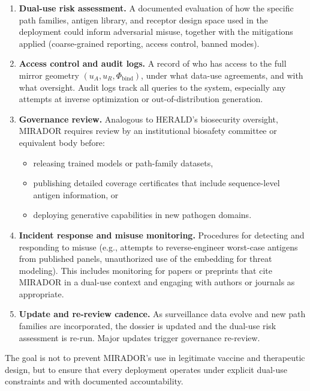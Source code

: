 \documentclass[11pt]{article}
\begin{document}
\begin{enumerate}
  \item \textbf{Dual-use risk assessment.}
  A documented evaluation of how the specific path families, antigen library, and receptor
  design space used in the deployment could inform adversarial misuse, together with the
  mitigations applied (coarse-grained reporting, access control, banned modes).

  \item \textbf{Access control and audit logs.}
  A record of who has access to the full mirror geometry $(u_A, u_R, \Phi_{\mathrm{bind}})$,
  under what data-use agreements, and with what oversight. Audit logs track all queries to the
  system, especially any attempts at inverse optimization or out-of-distribution generation.

  \item \textbf{Governance review.}
  Analogous to HERALD's biosecurity oversight, MIRADOR requires review by an institutional
  biosafety committee or equivalent body before:
  \begin{itemize}
    \item releasing trained models or path-family datasets,
    \item publishing detailed coverage certificates that include sequence-level antigen
          information, or
    \item deploying generative capabilities in new pathogen domains.
  \end{itemize}

  \item \textbf{Incident response and misuse monitoring.}
  Procedures for detecting and responding to misuse (e.g., attempts to reverse-engineer
  worst-case antigens from published panels, unauthorized use of the embedding for threat
  modeling). This includes monitoring for papers or preprints that cite MIRADOR in a dual-use
  context and engaging with authors or journals as appropriate.

  \item \textbf{Update and re-review cadence.}
  As surveillance data evolve and new path families are incorporated, the dossier is updated
  and the dual-use risk assessment is re-run. Major updates trigger governance re-review.
\end{enumerate}

The goal is not to prevent MIRADOR's use in legitimate vaccine and therapeutic design, but to
ensure that every deployment operates under explicit dual-use constraints and with documented
accountability.
\end{document}
